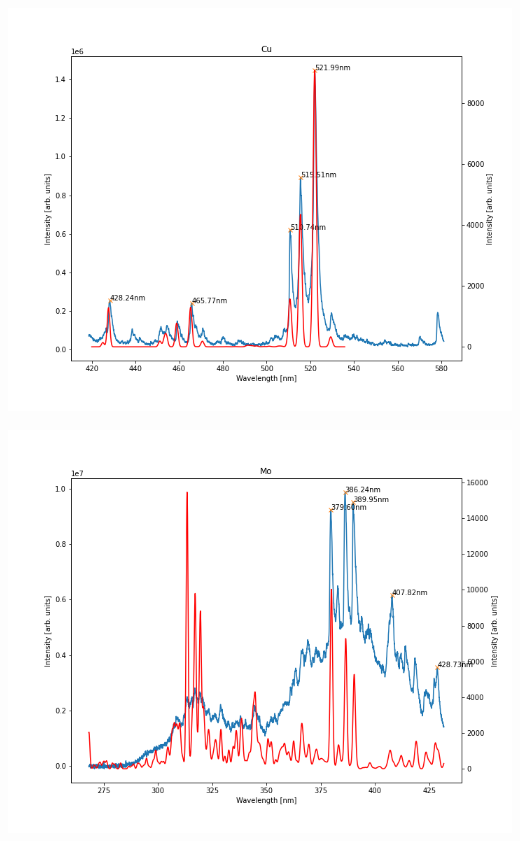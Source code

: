 \documentclass{beamer}
\begin{document}
\begin{frame}
    \includegraphics[scale=0.45]{Cu/500nm_10nmslit.png}
\end{frame}

\begin{frame}
    \includegraphics[scale=0.45]{Mo/350nm.png}
\end{frame}
\end{document}
